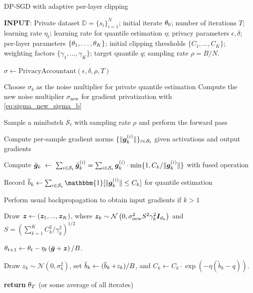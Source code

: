 \begin{algorithm}
\caption{DP-SGD with adaptive per-layer clipping}
\label{alg:perlayer-DPSGD}
\begin{algorithmic}[1]
\State \textbf{INPUT}:  Private dataset  $\mathbb{D}=\{s_i\}_{i=1}^N$; initial iterate $\mathbf{\theta}_0$; number of iterations $T$; learning rate $\eta_t$; learning rate for quantile estimation $\eta$; privacy parameters $\epsilon, \delta$; per-layer parameters $\{\mathbf{\theta}_1, \dots, \mathbf{\theta}_K\}$; initial  clipping thresholds $\{C_1,\dots, C_K\}$; weighting factors $\{\gamma_1,\dots,  \gamma_K\}$; target quantile $q$; sampling rate $\rho=B/N$.

\State $\sigma \leftarrow \text{PrivacyAccountant}(\epsilon, \delta, \rho, T)$


\State Choose $\sigma_b$ as the noise multiplier for private quantile estimation
\State Compute the new noise multiplier $\sigma_{\text{new}}$ for gradient privatization with \eqref{eq:sigma_new_sigma_b}



    \State 
    
    Sample a minibatch $\mathcal{S}_t$ with sampling rate $\rho$ and perform the forward pass
    




        \State Compute per-sample gradient norms $\{\| \bm{g}_{k}^{(i)} \|\}_{i\in\mathcal{S}_t}$  given activations and output gradients
        
        \State Compute $\tilde{\bm{g}}_{k} \hspace{1mm} \gets \hspace{1mm}
            \sum_{i\in\mathcal{S}_t} \tilde{\bm{g}}_{k}^{(i)} = 
            \sum_{i\in\mathcal{S}_t} \bm{g}_{k}^{(i)} \cdot \min \{1, C_k / \| \bm{g}_{k}^{(i)} \| \} $ with fused operation

        \State Record
        $\widebar{b}_k \gets \sum_{ i\in \mathcal{S}_t } \mathbbm{1}[ \|\vg_k^{(i)}\|\le C_k ] $ for quantile estimation

        \State Perform usual backpropagation to obtain input gradients if $k > 1$
    \EndFor

    
    \State Draw $\bm{z} \gets (\bm{z}_1, ..., \bm{z}_K)$, where  $\bm{z}_k\sim\mathcal{N}\left(0,\sigma_{\text{new}}^2  S^2 \gamma_k^2 \bm{I}_{d_k}\right)$ and $S = (\sum_{k=1}^K C_k^2/\gamma_k^2)^{1/2}$

    \State $\mathbf{\theta}_{t+1} \gets \mathbf{\theta}_t-{\eta_t}\left(\tilde{\bm{g}}+ \bm{z}\right)/B$.
 

        
        \State Draw $z_k \sim \mathcal{N}(0, \sigma_b^2) $, set $\tilde{b}_k \gets (\mathop{\overline{b}}_k+ z_k) / B$, and $C_k \leftarrow C_k \cdot \exp(-\eta(\tilde{b}_k-q))$. 
    \EndFor
\EndFor

\State \textbf{return} $\mathbf{\theta}_T$ (or some average of all iterates)
\end{algorithmic}
\end{algorithm}
